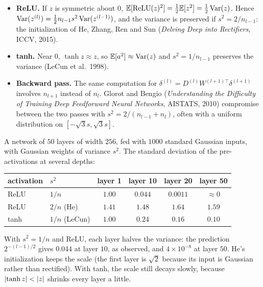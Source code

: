 \begin{notechapter}
\begin{itemize}
  \item \textbf{ReLU.} If $z$ is symmetric about $0$, $\mathbb{E}[\mathrm{ReLU}(z)^2] = \frac12\mathbb{E}[z^2] = \frac12\operatorname{Var}(z)$. Hence
        $\operatorname{Var}(z^{(l)}) = \frac12n_{l-1}s^2\operatorname{Var}(z^{(l-1)})$, and the variance is preserved if $s^2 = 2/n_{l-1}$: the
        initialization of He, Zhang, Ren and Sun (\emph{Delving Deep into Rectifiers},
        ICCV, 2015).
  \item \textbf{tanh.} Near $0$, $\tanh z\approx z$, so $\mathbb{E}[a^2]\approx\operatorname{Var}(z)$ and $s^2 = 1/n_{l-1}$ preserves the variance
        (LeCun et al.\ 1998).
  \item \textbf{Backward pass.} The same computation for $\delta^{(l)} = D^{(l)}W^{(l+1)\top}\delta^{(l+1)}$ involves $n_{l+1}$ instead of
        $n_l$. Glorot and Bengio (\emph{Understanding the Difficulty of Training Deep Feedforward
        Neural Networks}, AISTATS, 2010) compromise between the two passes with
        $s^2 = 2/(n_{l-1} + n_l)$, often with a uniform distribution on $[-\sqrt{3}s,\sqrt3s]$.
\end{itemize}

\begin{example}\label{activation-functions:ex:init}
A network of $50$ layers of width $256$, fed with $1000$ standard Gaussian inputs, with
Gaussian weights of variance $s^2$. The standard deviation of the pre-activations at several
depths:

\begin{center}
\begin{tabular}{llcccc}
\toprule
activation & $s^2$ & layer 1 & layer 10 & layer 20 & layer 50 \\
\midrule
ReLU & $1/n$ & $1.00$ & $0.044$ & $0.0011$ & $\approx0$ \\
ReLU & $2/n$ (He) & $1.41$ & $1.48$ & $1.64$ & $1.59$ \\
tanh & $1/n$ (LeCun) & $1.00$ & $0.24$ & $0.16$ & $0.10$ \\
\bottomrule
\end{tabular}
\end{center}

With $s^2 = 1/n$ and ReLU, each layer halves the variance: the prediction $2^{-(l-1)/2}$ gives
$0.044$ at layer $10$, as observed, and $4\times10^{-8}$ at layer $50$. He's initialization keeps the scale (the
first layer is $\sqrt2$ because its input is Gaussian rather than rectified). With tanh, the
scale still decays slowly, because $\left|\tanh z\right|<\left|z\right|$ shrinks every layer a little.
\end{example}


\end{notechapter}
